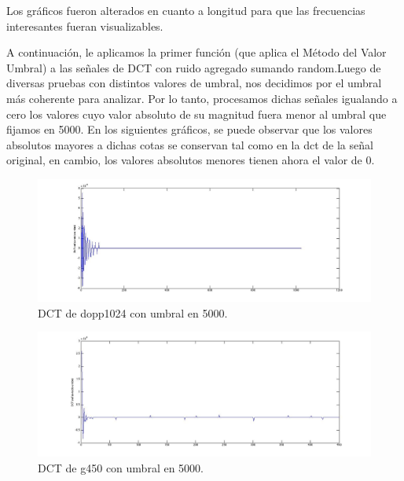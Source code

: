 \documentclass[10pt, a4paper]{article}
\begin{document}
\begin{itemize}
Los gráficos fueron alterados en cuanto a longitud para que las frecuencias interesantes fueran visualizables.\newline
\newline

A continuación, le aplicamos la primer función (que aplica el Método del Valor Umbral) a las señales de DCT con ruido agregado sumando random.\newline Luego de diversas pruebas con distintos valores de umbral, nos decidimos por el umbral más coherente para analizar. Por lo tanto, procesamos dichas señales igualando a cero los valores cuyo valor absoluto de su magnitud fuera menor al umbral que fijamos en 5000. En los siguientes gráficos, se puede observar que los valores absolutos mayores a dichas cotas se conservan tal como en la dct de la señal original, en cambio, los valores absolutos menores tienen ahora el valor de 0.


\begin{figure}[H] %
\begin{center}
\includegraphics[width=500pt]{./umbral1_dopp1024.jpg}
\caption[h]{DCT de dopp1024 con umbral en 5000.}
\end{center}
\end{figure}


\begin{figure}[H] %
\begin{center}
\includegraphics[width=500pt]{./umbral1_g450.jpg}
\caption[h]{DCT de g450 con umbral en 5000.}
\end{center}
\end{figure}



\end{itemize}
\end{document}
